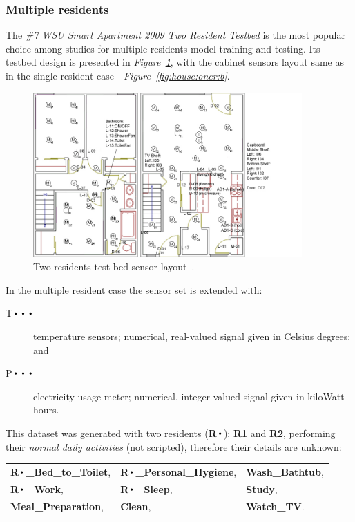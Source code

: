 \documentclass[10pt, a4paper, pdflatex, leqno, twoside, openright]{report}
\DeclareMathOperator*{\Bigcdot}{\scalerel*{\cdot}{\bigodot}}
\begin{document}
      \subsubsection{Multiple residents}
The \emph{\#7 WSU Smart Apartment 2009 Two Resident Testbed} is the most popular choice among studies for multiple residents model training and testing. Its testbed design is presented in \emph{Figure~\ref{fig:house:twor}}, with the cabinet sensors layout same as in the single resident case---\emph{Figure~\ref{fig:house:oner:b}}.\\
\begin{figure}[htb]
  \centering%
  \includegraphics[height=6.3cm]{gfx/sensorlayoutTWOR.jpg}
  \caption[Two residents test-bed sensor layout.]{Two residents test-bed sensor layout~\citep{cook2009assessing}.\label{fig:house:twor}}
\end{figure}

In the multiple resident case the sensor set is extended with:
\begin{description}
\item[T$\Bigcdot\Bigcdot\Bigcdot$] temperature sensors; numerical, real-valued signal given in Celsius degrees; and
\item[P$\Bigcdot\Bigcdot\Bigcdot$] electricity usage meter; numerical, integer-valued signal given in kiloWatt hours.
\end{description}

This dataset was generated with two residents (\textbf{R$\Bigcdot$}): \textbf{R1} and \textbf{R2}, performing their \emph{normal daily activities} (not scripted), therefore their details are unknown:\\[1em]
\begin{tabular}{ l l l }
  \textbf{R$\Bigcdot$\_Bed\_to\_Toilet}, & \textbf{R$\Bigcdot$\_Personal\_Hygiene}, & \textbf{Wash\_Bathtub}, \\
  \textbf{R$\Bigcdot$\_Work}, & \textbf{R$\Bigcdot$\_Sleep}, & \textbf{Study}, \\
  \textbf{Meal\_Preparation}, & \textbf{Clean}, & \textbf{Watch\_TV}. \\
\end{tabular}
~\\[1em]
\end{document}
